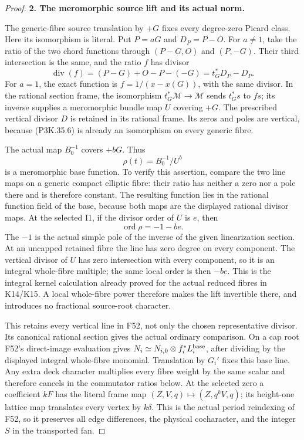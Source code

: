 \begin{proof}
\par\medskip\noindent\textbf{2. The meromorphic source lift and its actual norm.}\enspace

The generic-fibre source translation by \(+G\) fixes every degree-zero
Picard class. Here its isomorphism is literal. Put \(P=aG\) and
\(D_P=P-O\). For \(a\ne1\), take the ratio of the two chord functions
through \((P-G,O)\) and \((P,-G)\). Their third intersection is the
same, and the ratio \(f\) has divisor
\[
             \operatorname{div}(f)
                 =(P-G)+O-P-(-G)=t_G^*D_P-D_P.         \tag{P3K.35.6}
\]
For \(a=1\), the exact function is \(f=1/(x-x(G))\), with the
same divisor. In the rational section frame, the isomorphism
\(t_G^*\mathcal M\to\mathcal M\) sends \(t_G^*s\) to \(fs\);
its inverse supplies a meromorphic bundle map \(U\) covering \(+G\).
The prescribed vertical divisor \(D\) is retained in its rational
frame. Its zeros and poles are vertical, because (P3K.35.6) is already
an isomorphism on every generic fibre.

The actual map \(B_0^{-1}\) covers \(+bG\). Thus
\[
                        \rho(t)=B_0^{-1}/U^b            \tag{P3K.35.7}
\]
is a meromorphic base function. To verify this assertion, compare the
two line maps on a generic compact elliptic fibre: their ratio has
neither a zero nor a pole there and is therefore constant. The resulting
function lies in the rational function field of the base, because both
maps are the displayed rational divisor maps. At the selected I1, if
the divisor order of \(U\) is \(e\), then
\[
                      \operatorname{ord}\rho=-1-be.     \tag{P3K.35.8}
\]
The \(-1\) is the actual simple pole of the inverse of the given
linearization section. At an uncapped retained fibre the line has zero
degree on every component. The vertical divisor of \(U\) has zero
intersection with every component, so it is an integral whole-fibre
multiple; the same local order is then \(-be\). This is the integral
kernel calculation already proved for the actual reduced fibres in
K14/K15. A local whole-fibre power therefore makes the lift invertible
there, and introduces no fractional source-root character.

This retains every vertical line in F52, not only the chosen
representative divisor. Its canonical rational section gives the
actual ordinary comparison. On a cap root F52's direct-image
evaluation gives \(N_i\simeq N_{i,0}\otimes f_i^*L_i^{\rm base}\),
after dividing by the displayed integral whole-fibre monomial.
Translation by \(G_i'\) fixes this base line. Any extra deck
character multiplies every fibre weight by the same scalar and
therefore cancels in the commutator ratios below. At the selected
zero a coefficient \(kF\) has the literal frame map
\((Z,V,q)\mapsto(Z,q^kV,q)\); its height-one lattice map translates
every vertex by \(k\delta\). This is the actual period reindexing
of F52, so it preserves all edge differences, the physical
cocharacter, and the integer \(S\) in the transported fan.


\end{proof}
